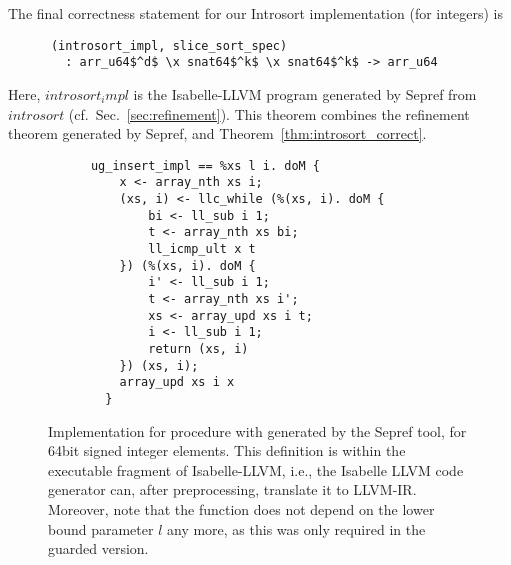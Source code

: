 \documentclass[sigplan,10pt,anonymous,review]{acmart}\settopmatter{printfolios=true,printccs=false,printacmref=false}
\theoremstyle{definition}
\begin{document}
  The final correctness statement for our Introsort implementation (for integers) is
  \begin{theorem}
    \begin{lstlisting}
      (introsort_impl, slice_sort_spec)
        : arr_u64$^d$ \x snat64$^k$ \x snat64$^k$ -> arr_u64
    \end{lstlisting}
  \end{theorem}
  Here, \is$introsort_impl$ is the Isabelle-LLVM program generated by Sepref from \is$introsort$ (cf.\ Sec.\ \ref{sec:refinement}).
  This theorem combines the refinement theorem generated by Sepref, and Theorem~\ref{thm:introsort_correct}.

  \begin{figure}
    \begin{lstlisting}
      ug_insert_impl == %xs l i. doM {
          x <- array_nth xs i;
          (xs, i) <- llc_while (%(xs, i). doM {
              bi <- ll_sub i 1;
              t <- array_nth xs bi;
              ll_icmp_ult x t
          }) (%(xs, i). doM {
              i' <- ll_sub i 1;
              t <- array_nth xs i';
              xs <- array_upd xs i t;
              i <- ll_sub i 1;
              return (xs, i)
          }) (xs, i);
          array_upd xs i x
        }
    \end{lstlisting}
    \caption{Implementation for  procedure with  generated by the Sepref tool, for 64bit signed integer elements.
      This definition is within the executable fragment of Isabelle-LLVM, i.e.,
      the Isabelle LLVM code generator can, after preprocessing, translate it to LLVM-IR. Moreover, note that the function does not
      depend on the lower bound parameter \is$l$ any more, as this was only required in the guarded version.
    }\label{fig:ug_insort_isa_llvm}
  \end{figure}
\end{document}
